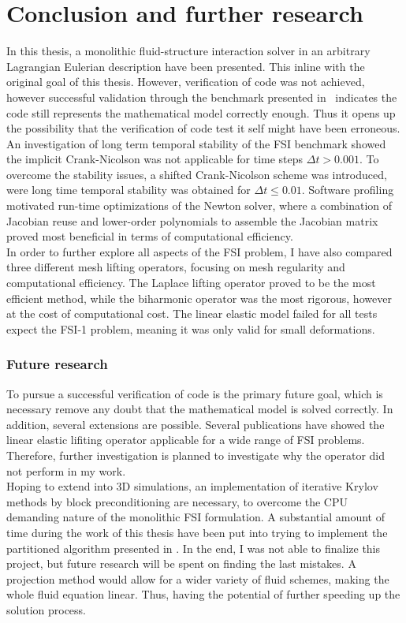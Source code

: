 \chapter{Conclusion and further research}

In this thesis, a monolithic fluid-structure interaction solver in an arbitrary Lagrangian Eulerian description have been presented. This inline with the original goal of this thesis. However, verification of code was not achieved, however successful validation through the benchmark presented in~\cite{Hron2006} indicates the code still represents the mathematical model correctly enough. Thus it opens up the possibility that the verification of code test it self might have been erroneous. \\

An investigation of long term temporal stability of the FSI benchmark showed the implicit Crank-Nicolson was not applicable for time steps $\Delta t > 0.001$. To overcome the stability issues, a shifted Crank-Nicolson scheme was introduced, were long time temporal stability was obtained for $\Delta t \leq 0.01$. Software profiling motivated run-time optimizations of the Newton solver, where a combination of Jacobian reuse and lower-order polynomials to assemble the Jacobian matrix proved most beneficial in terms of computational efficiency. \\

In order to further explore all aspects of the FSI problem, I have also compared three different mesh lifting operators, focusing on mesh regularity and computational efficiency. The Laplace lifting operator proved to be the most efficient method, while the biharmonic operator was the most rigorous, however at the cost of computational cost. The linear elastic model failed for all tests expect the FSI-1 problem, meaning it was only valid for small deformations. 

\newpage
\subsection*{Future research}
To pursue a successful verification of code is the primary future goal, which is necessary remove any doubt that the mathematical model is solved correctly. In addition, several extensions are possible. Several publications have showed the linear elastic lifiting operator applicable for a wide range of FSI problems. Therefore, further investigation is planned to investigate why the operator did not perform in my work. \\

Hoping to extend into 3D simulations, an implementation of iterative Krylov methods by block preconditioning are necessary, to overcome the CPU demanding nature of the monolithic FSI formulation. A substantial amount of time during the work of this thesis have been put into trying to implement the partitioned algorithm presented in \cite{Fernandez2007}. In the end, I was not able to finalize this project, but future research will be spent on finding the last mistakes. A projection method would allow for a wider variety of fluid schemes, making the whole fluid equation linear. Thus, having the potential of further speeding up the solution process.
